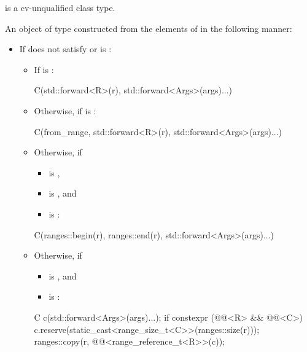 \begin{itemdescr}
\pnum
\mandates
{} is a cv-unqualified class type.

\pnum
\returns
An object of type 
constructed from the elements of  in the following manner:
\begin{itemize}
\item
If  does not satisfy  or
is :
\begin{itemize}
\item
If  is :
\begin{codeblock}
C(std::forward<R>(r), std::forward<Args>(args)...)
\end{codeblock}
\item
Otherwise, if
is :
\begin{codeblock}
C(from_range, std::forward<R>(r), std::forward<Args>(args)...)
\end{codeblock}
\item
Otherwise, if
\begin{itemize}
\item
{} is ,
\item
{} is , and
\item
{}
is :
\end{itemize}
\begin{codeblock}
C(ranges::begin(r), ranges::end(r), std::forward<Args>(args)...)
\end{codeblock}
\item
Otherwise, if
\begin{itemize}
\item
{} is , and
\item
{} is :
\end{itemize}
\begin{codeblock}
C c(std::forward<Args>(args)...);
if constexpr (@@<R> && @@<C>)
  c.reserve(static_cast<range_size_t<C>>(ranges::size(r)));
ranges::copy(r, @@<range_reference_t<R>>(c));
\end{codeblock}
\end{itemize}


\end{itemize}
\end{itemdescr}

